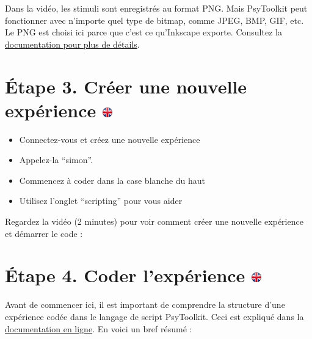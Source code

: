 \documentclass[
]{book}
\providecommand{\tightlist}{%
  \setlength{\itemsep}{0pt}\setlength{\parskip}{0pt}}
\begin{document}
Dans la vidéo, les stimuli sont enregistrés au format PNG. Mais PsyToolkit peut fonctionner avec n'importe quel type de bitmap, comme JPEG, BMP, GIF, etc. Le PNG est choisi ici parce que c'est ce qu'Inkscape exporte. Consultez la \protect\hyperlink{s4-2}{documentation pour plus de détails}.

\hypertarget{uxe9tape-3.-cruxe9er-une-nouvelle-expuxe9rience}{%
\section[Étape 3. Créer une nouvelle expérience ]{\texorpdfstring{Étape 3. Créer une nouvelle expérience \href{https://www.psytoolkit.org/lessons/project.html\#_step_3_create_new_experiment}{\protect\includegraphics{img/ukflag.png}}}{Étape 3. Créer une nouvelle expérience }}\label{uxe9tape-3.-cruxe9er-une-nouvelle-expuxe9rience}}

\begin{itemize}
\tightlist
\item
  Connectez-vous et créez une nouvelle expérience
\item
  Appelez-la ``simon''.
\item
  Commencez à coder dans la case blanche du haut
\item
  Utilisez l'onglet ``scripting'' pour vous aider
\end{itemize}

Regardez la vidéo (2 minutes) pour voir comment créer une nouvelle expérience et démarrer le code :

\hypertarget{uxe9tape-4.-coder-lexpuxe9rience}{%
\section[Étape 4. Coder l'expérience ]{\texorpdfstring{Étape 4. Coder l'expérience \href{https://www.psytoolkit.org/lessons/project.html\#_step_4_create_new_experiment}{\protect\includegraphics{img/ukflag.png}}}{Étape 4. Coder l'expérience }}\label{uxe9tape-4.-coder-lexpuxe9rience}}

Avant de commencer ici, il est important de comprendre la structure d'une expérience codée dans le langage de script PsyToolkit. Ceci est expliqué dans la \protect\hyperlink{structure_of_scripts}{documentation en ligne}. En voici un bref résumé :
\end{document}
